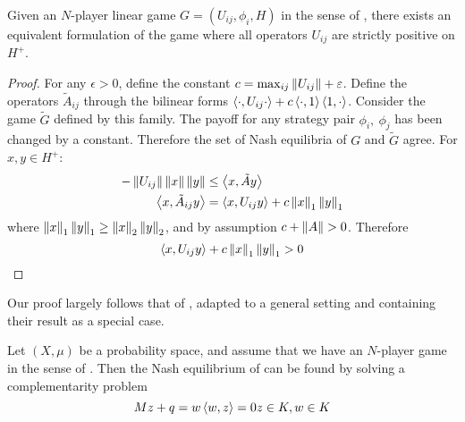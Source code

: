\begin{lemma}\label{lem:equiv_game}
	Given an $N$-player linear game $G = (U_{ij}, \phi_i, H)$ in the sense of , there exists an equivalent formulation of the game where all operators $U_{ij}$ are strictly positive on $H^{+}$.
\end{lemma}
\begin{proof}
	For any $\epsilon>0$, define the constant $c=\max_{ij} \left \Vert U_{ij} \right \Vert+\varepsilon$. Define the operators $\tilde{A}_{ij}$ through the bilinear forms $\left \langle \cdot,U_{ij}\cdot \right \rangle + c\left \langle \cdot,1 \right \rangle\left \langle 1,\cdot \right \rangle$. Consider the game $\tilde{G}$ defined by this family. The payoff for any strategy pair $\phi_{i},~\phi_{j}$ has been changed by a constant. Therefore the set of Nash equilibria of $G$ and $\tilde{G}$ agree.
	For $x,y\in H^+$:
	\begin{align}
		-\left \Vert U_{ij} \right \Vert\left \Vert x \right \Vert\left \Vert y \right \Vert &\leq \left \langle x,\tilde{A}y \right \rangle \\
		\left \langle x,\tilde{A}_{ij}y \right \rangle &= \left \langle x,U_{ij}y \right \rangle + c\left \Vert x \right \Vert_1\left \Vert y \right \Vert_1
	\end{align}
	where $\left \Vert x \right \Vert_1\left \Vert y \right \Vert_1 \geq \left \Vert x \right \Vert_2\left \Vert y \right \Vert_2$, and by assumption $c+\left \Vert A \right \Vert > 0$. Therefore
	\begin{equation}
		\left \langle x,U_{ij}y \right \rangle + c\left \Vert x \right \Vert_1\left \Vert y \right \Vert_1 >0
	\end{equation}
\end{proof}
Our proof largely follows that of \citep{millerzucker}, adapted to a general setting and containing their result as a special case.
\begin{theorem} \label{thm:nash_eq}
  Let $(X,\mu)$ be a probability space, and assume that we have an $N$-player game in the sense of . Then the Nash equilibrium of  can be found by solving a complementarity problem
  \begin{equation}
		\label{eq:complementarity_problem}
    Mz+q=w \\
    \left \langle w,z \right \rangle = 0 \\
    z \in K, w\in K
  \end{equation}
\end{theorem}
